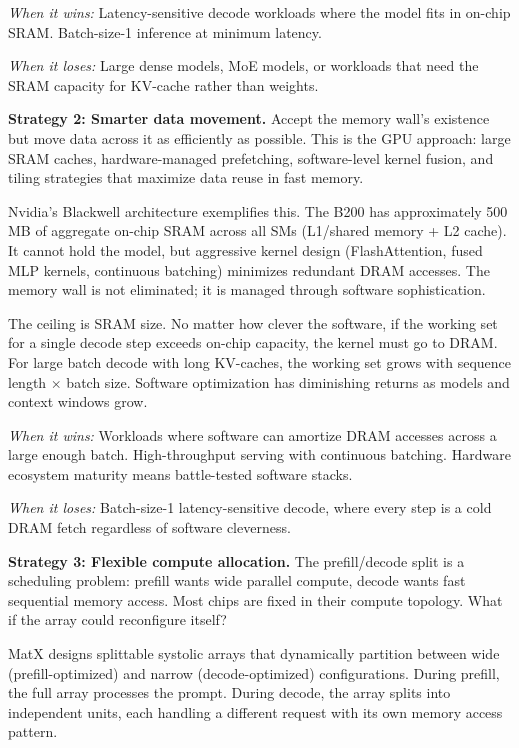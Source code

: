 \textit{When it wins:} Latency-sensitive decode workloads where the model fits in on-chip SRAM. Batch-size-1 inference at minimum latency.

\textit{When it loses:} Large dense models, MoE models, or workloads that need the SRAM capacity for KV-cache rather than weights.

\textbf{Strategy 2: Smarter data movement.} Accept the memory wall's existence but move data across it as efficiently as possible. This is the GPU approach: large SRAM caches, hardware-managed prefetching, software-level kernel fusion, and tiling strategies that maximize data reuse in fast memory.

Nvidia's Blackwell architecture exemplifies this. The B200 has approximately 500\,MB of aggregate on-chip SRAM across all SMs (L1/shared memory + L2 cache). It cannot hold the model, but aggressive kernel design (FlashAttention, fused MLP kernels, continuous batching) minimizes redundant DRAM accesses. The memory wall is not eliminated; it is managed through software sophistication.

The ceiling is SRAM size. No matter how clever the software, if the working set for a single decode step exceeds on-chip capacity, the kernel must go to DRAM. For large batch decode with long KV-caches, the working set grows with sequence length $\times$ batch size. Software optimization has diminishing returns as models and context windows grow.

\textit{When it wins:} Workloads where software can amortize DRAM accesses across a large enough batch. High-throughput serving with continuous batching. Hardware ecosystem maturity means battle-tested software stacks.

\textit{When it loses:} Batch-size-1 latency-sensitive decode, where every step is a cold DRAM fetch regardless of software cleverness.

\textbf{Strategy 3: Flexible compute allocation.} The prefill/decode split is a scheduling problem: prefill wants wide parallel compute, decode wants fast sequential memory access. Most chips are fixed in their compute topology. What if the array could reconfigure itself?

MatX designs splittable systolic arrays that dynamically partition between wide (prefill-optimized) and narrow (decode-optimized) configurations. During prefill, the full array processes the prompt. During decode, the array splits into independent units, each handling a different request with its own memory access pattern.

